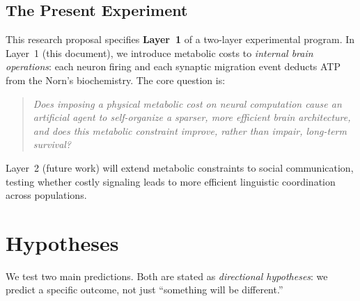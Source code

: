 \documentclass[12pt, a4paper]{article}
\begin{document}
\subsection{The Present Experiment}

This research proposal specifies \textbf{Layer~1} of a two-layer experimental program. In Layer~1 (this document), we introduce metabolic costs to \emph{internal brain operations}: each neuron firing and each synaptic migration event deducts ATP from the Norn's biochemistry. The core question is:

\begin{quote}
\textit{Does imposing a physical metabolic cost on neural computation cause an artificial agent to self-organize a sparser, more efficient brain architecture, and does this metabolic constraint improve, rather than impair, long-term survival?}
\end{quote}

Layer~2 (future work) will extend metabolic constraints to social communication, testing whether costly signaling leads to more efficient linguistic coordination across populations.

\section{Hypotheses}
\label{sec:hypotheses}

We test two main predictions. Both are stated as \emph{directional hypotheses}: we predict a specific outcome, not just ``something will be different.''
\end{document}
